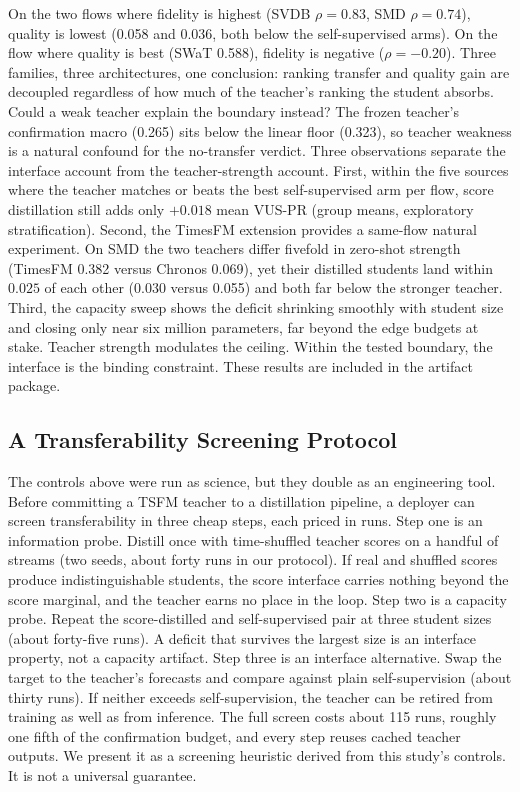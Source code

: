 \documentclass[pdflatex,sn-basic,Numbered]{sn-jnl}
\begin{document}
On the two flows where fidelity is highest (SVDB $\rho=0.83$, SMD $\rho=0.74$),
quality is lowest (0.058 and 0.036, both below the self-supervised arms).
On the flow where quality is best (SWaT 0.588), fidelity is negative
($\rho=-0.20$).
Three families, three architectures, one conclusion: ranking transfer and
quality gain are decoupled regardless of how much of the teacher's ranking
the student absorbs.
Could a weak teacher explain the boundary instead?
The frozen teacher's confirmation macro (0.265) sits below the linear
floor (0.323), so teacher weakness is a natural confound for the
no-transfer verdict.
Three observations separate the interface account from the
teacher-strength account.
First, within the five sources where the teacher matches or beats the
best self-supervised arm per flow, score distillation still adds only
$+0.018$ mean VUS-PR (group means, exploratory stratification).
Second, the TimesFM extension provides a same-flow natural experiment.
On SMD the two teachers differ fivefold in zero-shot strength (TimesFM
0.382 versus Chronos 0.069), yet their distilled students land within
$0.025$ of each other (0.030 versus 0.055) and both far below the
stronger teacher.
Third, the capacity sweep shows the deficit shrinking smoothly with
student size and closing only near six million parameters, far beyond
the edge budgets at stake.
Teacher strength modulates the ceiling.
Within the tested boundary, the interface is the binding constraint.
These results are included in the artifact package.

\subsection{A Transferability Screening Protocol}
The controls above were run as science, but they double as an engineering
tool.
Before committing a TSFM teacher to a distillation pipeline, a deployer
can screen transferability in three cheap steps, each priced in runs.
Step one is an information probe.
Distill once with time-shuffled teacher scores on a handful of streams
(two seeds, about forty runs in our protocol).
If real and shuffled scores produce indistinguishable students, the
score interface carries nothing beyond the score marginal, and the
teacher earns no place in the loop.
Step two is a capacity probe.
Repeat the score-distilled and self-supervised pair at three student
sizes (about forty-five runs).
A deficit that survives the largest size is an interface property, not a
capacity artifact.
Step three is an interface alternative.
Swap the target to the teacher's forecasts and compare against plain
self-supervision (about thirty runs).
If neither exceeds self-supervision, the teacher can be retired from
training as well as from inference.
The full screen costs about 115 runs, roughly one fifth of the
confirmation budget, and every step reuses cached teacher outputs.
We present it as a screening heuristic derived from this study's controls.
It is not a universal guarantee.
\end{document}
